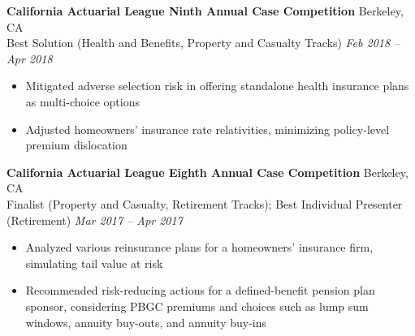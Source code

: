 \documentclass[11pt,letterpaper]{article}
\newcommand{\smallspace}{\vspace{2pt}}
\begin{document}
\textbf{California Actuarial League Ninth Annual Case Competition} \hfill Berkeley, CA \\
Best Solution (Health and Benefits, Property and Casualty Tracks) \hfill \textit{Feb 2018 -- Apr 2018} \\
\begin{itemize}
	\item Mitigated adverse selection risk in offering standalone health insurance plans as multi-choice options
	\item Adjusted homeowners' insurance rate relativities, minimizing policy-level premium dislocation 
\end{itemize}
\smallspace 
\textbf{California Actuarial League Eighth Annual Case Competition} \hfill Berkeley, CA \\
Finalist (Property and Casualty, Retirement Tracks); Best Individual Presenter (Retirement) \hfill \textit{Mar 2017 -- Apr 2017} \\
\begin{itemize}
	\item Analyzed various reinsurance plans for a homeowners' insurance firm, simulating tail value at risk
	\item Recommended risk-reducing actions for a defined-benefit pension plan sponsor, considering PBGC premiums and choices such as lump sum windows, annuity buy-outs, and annuity buy-ins

\end{itemize}


\end{document}
